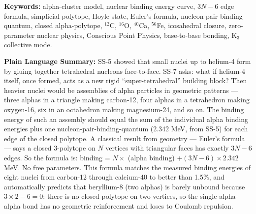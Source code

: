 \documentclass[11pt,letterpaper]{article}
\newcommand{\Bpair}{B_{\mathrm{pair}}}
\newcommand{\Balpha}{B_{\alpha}}
\begin{document}
\begin{abstract}
The paper establishes the alpha-cluster regime as a third predictive sector of CPP nuclear physics (after $A \leq 4$ cascade and deuteron-observable scoping), adds 8 new zero-parameter predictions to the CPP programme, and reduces the axiom-to-prediction ratio further. The model is expected to apply only to nuclei admitting compact $\alpha$-cluster tilings approximating maximal planar connectivity; non-alpha-chain nuclei (odd-$A$, neutron-rich, $N \neq Z$) are registered as OPEN-SS-23. Systematic residuals of $+2$--$4\%$ above $N_\alpha = 10$ (${}^{48}$Ti onward) signal additional physics at icosahedral closure ($N_\alpha = 12$), registered as OPEN-SS-22.

An adversarial stress test (\S\ref{sec:stress_test}) confirms empirically that the $3N_\alpha - 6$ edge count is preferred over plausible lower-edge alternatives for ${}^{32}$S, ${}^{28}$Si, ${}^{36}$Ar, and ${}^{40}$Ca at fixed ($\Balpha$, $\Bpair$); none of the tested alternatives outperform the simplicial rule.
\end{abstract}

\medskip\noindent
\textbf{Keywords:} alpha-cluster model, nuclear binding energy curve, $3N-6$ edge formula, simplicial polytope, Hoyle state, Euler's formula, nucleon-pair binding quantum, closed alpha-polytope, $^{12}$C, $^{16}$O, $^{40}$Ca, $^{56}$Fe, icosahedral closure, zero-parameter nuclear physics, Conscious Point Physics, base-to-base bonding, K$_3$ collective mode.

\bigskip\noindent
\textbf{Plain Language Summary:}
SS-5 showed that small nuclei up to helium-4 form by gluing together tetrahedral nucleons face-to-face. SS-7 asks: what if helium-4 itself, once formed, acts as a new rigid ``super-tetrahedral'' building block? Then heavier nuclei would be assemblies of alpha particles in geometric patterns --- three alphas in a triangle making carbon-12, four alphas in a tetrahedron making oxygen-16, six in an octahedron making magnesium-24, and so on. The binding energy of such an assembly should equal the sum of the individual alpha binding energies plus one nucleon-pair-binding-quantum (2.342 MeV, from SS-5) for each edge of the closed polytope. A classical result from geometry --- Euler's formula --- says a closed 3-polytope on $N$ vertices with triangular faces has exactly $3N - 6$ edges. So the formula is: binding = $N \times$ (alpha binding) $+ (3N - 6) \times 2.342$ MeV. No free parameters. This formula matches the measured binding energies of eight nuclei from carbon-12 through calcium-40 to better than 1.5\%, and automatically predicts that beryllium-8 (two alphas) is barely unbound because $3 \times 2 - 6 = 0$: there is no closed polytope on two vertices, so the single alpha-alpha bond has no geometric reinforcement and loses to Coulomb repulsion.
\end{document}
